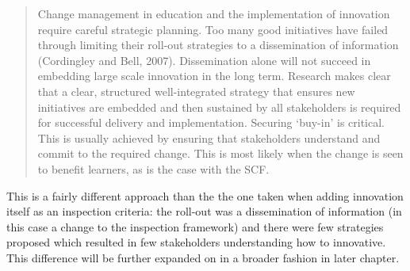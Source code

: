 \begin{quote}
Change management in education and the implementation of innovation require careful strategic planning. Too many good initiatives have failed through limiting their roll-out strategies to a dissemination of information (Cordingley and Bell, 2007). Dissemination alone will not succeed in embedding large scale innovation in the long term. Research makes clear that a clear, structured well-integrated strategy that ensures new initiatives are embedded and then sustained by all stakeholders is required for successful delivery and implementation. Securing ‘buy-in’ is critical. This is usually achieved by ensuring that stakeholders understand and commit to the required change. This is most likely when the change is seen to benefit learners, as is the case with the SCF.
\end{quote}

This is a fairly different approach than the the one taken when adding innovation itself as an inspection criteria: the roll-out was a dissemination of information (in this case a change to the inspection framework) and there were few strategies proposed which resulted in few stakeholders understanding how to innovative. This difference will be further expanded on in a broader fashion in later chapter.


